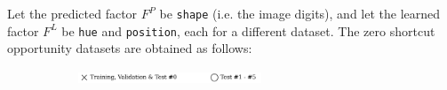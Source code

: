 \begin{definition}
\begin{figure}[H]
\begin{subfigure}[b]{0.45\textwidth}
\begin{subfigure}[b]{0.48\textwidth}
            \end{subfigure}
        \end{subfigure}
    \end{figure}
\end{definition}


\begin{definition}\label{def:zso_experiments}
    Let the predicted factor $F^P$ be \texttt{shape} (i.e. the image digits), and let the 
    learned factor $F^L$ be \texttt{hue} and \texttt{position}, each for a different dataset. The 
    zero shortcut opportunity datasets are obtained as follows:

    \begin{figure}[H]
        \centering
        \begin{subfigure}[b]{\textwidth}
            \centering
            \includegraphics[width=0.6\textwidth]{img/datasets/_legend.pdf}
        \end{subfigure}
        \vspace{-0.2cm} %


\end{figure}
\end{definition}
